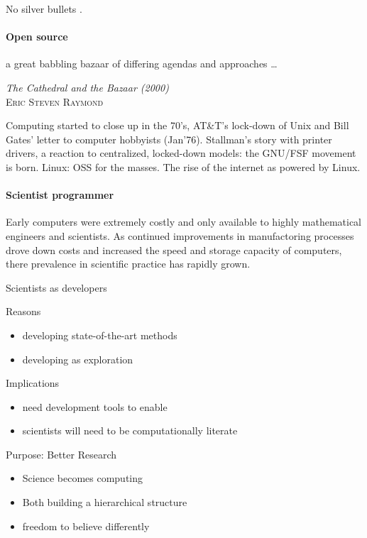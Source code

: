 \documentclass[ChapterTOCs,krantz2]{krantz} %
\begin{document}
No silver bullets \cite{brooks1995mythical}.

\paragraph{ {\bf Open source}}

\setlength{\epigraphrule}{0pt}
\setlength{\epigraphwidth}{.65\textwidth}
\epigraph%
{%
  a great babbling bazaar of differing agendas and approaches \ldots
}%
{\textit{The Cathedral and the Bazaar (2000)}\\ \textsc{Eric Steven Raymond} }

Computing started to close up in the 70's, AT\&T's lock-down of Unix
and Bill Gates' letter to computer hobbyists (Jan'76). Stallman's
story with printer drivers, a reaction to centralized, locked-down
models: the GNU/FSF movement is born. Linux: OSS for the masses. The
rise of the internet as powered by Linux.


\paragraph{ {\bf Scientist programmer}}

Early computers were extremely costly and only available to highly mathematical
engineers and scientists. As continued improvements in manufactoring processes
drove down costs and increased the speed and storage capacity of computers, there
prevalence in scientific practice has rapidly grown.

Scientists as developers

Reasons

\begin{itemize}
\item  developing state-of-the-art methods
\item developing as exploration
\end{itemize}

Implications

\begin{itemize}
\item need development tools to enable
\item scientists will need to be computationally literate
\end{itemize}

Purpose:  Better Research

\begin{itemize}
\item Science becomes computing
\item Both building a hierarchical structure
\item freedom to believe differently
\end{itemize}
\end{document}
